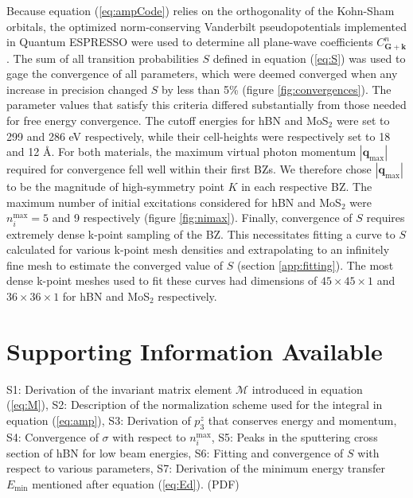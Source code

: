 \documentclass{article}
\begin{document}
Because equation (\ref{eq:ampCode}) relies on the orthogonality of the
Kohn-Sham orbitals, the optimized norm-conserving Vanderbilt
pseudopotentials \cite{Hamann2013, Schlipf2015} implemented in Quantum
ESPRESSO \cite{Giannozzi2009} were used to determine all plane-wave coefficients
$C^n_\mathbf{G+k}$.
The sum of all transition probabilities $S$ defined in equation (\ref{eq:S})
was used to gage the convergence of all parameters, which were deemed converged
when any increase in precision changed $S$ by less than 5\% (figure
\ref{fig:convergences}).
The parameter values that satisfy this criteria differed substantially from
those needed for free energy convergence.
The cutoff energies for hBN and MoS$_2$ were set to 299 and 286 eV
respectively, while their cell-heights were respectively set to 18 and 12
{\AA}.
For both materials, the maximum virtual photon momentum
$|\mathbf{q}_\text{max}|$ required for convergence fell well within their first
BZs.
We therefore chose $|\mathbf{q}_\text{max}|$ to be the magnitude of
high-symmetry point $K$ in each respective BZ.
The maximum number of initial excitations considered for hBN and MoS$_2$ were
$n_i^\text{max} = 5$ and 9 respectively (figure \ref{fig:nimax}).
Finally, convergence of $S$ requires extremely dense k-point sampling of the
BZ.
This necessitates fitting a curve to $S$ calculated for various k-point mesh
densities and extrapolating to an infinitely fine mesh to estimate the
converged value of $S$ (section \ref{app:fitting}).
The most dense k-point meshes used to fit these curves had dimensions of
$45\times45\times1$ and $36\times36\times1$ for hBN and MoS$_2$ respectively.

\section{Supporting Information Available}
\label{sec:si}

S1: Derivation of the invariant matrix element $\mathcal{M}$ introduced in
equation (\ref{eq:M}),
S2: Description of the normalization scheme used for the integral in equation
(\ref{eq:amp}),
S3: Derivation of $p_3^z$ that conserves energy and momentum,
S4: Convergence of $\sigma$ with respect to $n_i^\text{max}$,
S5: Peaks in the sputtering cross section of hBN for low beam energies,
S6: Fitting and convergence of $S$ with respect to various parameters,
S7: Derivation of the minimum energy transfer $E_\text{min}$ mentioned after
equation (\ref{eq:Ed}).
(PDF)
\end{document}
